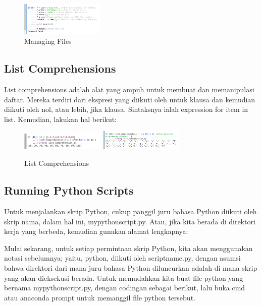 	\begin{figure}[H]
		\centering
		\includegraphics[width=4cm]{figures/kelompok1/1/1174021/tugas1/materi/3.PNG}
		\caption{Managing Files}
	\end{figure}

\subsection{List Comprehensions}
List comprehensions adalah alat yang ampuh untuk membuat dan memanipulasi daftar. Mereka terdiri dari ekspresi yang diikuti oleh untuk klausa dan kemudian diikuti oleh nol, atau lebih, jika klausa. Sintaksnya ialah expression for item in list. Kemudian, lakukan hal berikut:
\hfill\break

\hfill\break

	\begin{figure}[H]
		\centering
		\includegraphics[width=4cm]{figures/kelompok1/1/1174021/tugas1/materi/41.PNG}
		\includegraphics[width=4cm]{figures/kelompok1/1/1174021/tugas1/materi/42.PNG}
		\caption{List Comprehensions}
	\end{figure}

\subsection{Running Python Scripts}
Untuk menjalankan skrip Python, cukup panggil juru bahasa Python diikuti oleh skrip nama, dalam hal ini, mypythonscript.py. Atau, jika kita berada di direktori kerja yang berbeda, kemudian gunakan alamat lengkapnya:
\hfill\break

\hfill\break
Mulai sekarang, untuk setiap permintaan skrip Python, kita akan menggunakan
notasi sebelumnya; yaitu, python, diikuti oleh scriptname.py,
dengan asumsi bahwa direktori dari mana juru bahasa Python diluncurkan
adalah di mana skrip yang akan dieksekusi berada. Untuk memudahkan kita buat file python yang bernama mypythonscript.py, dengan codingan sebagai berikut, lalu buka cmd atau anaconda prompt untuk memanggil file python tersebut.
\hfill\break

\hfill\break

